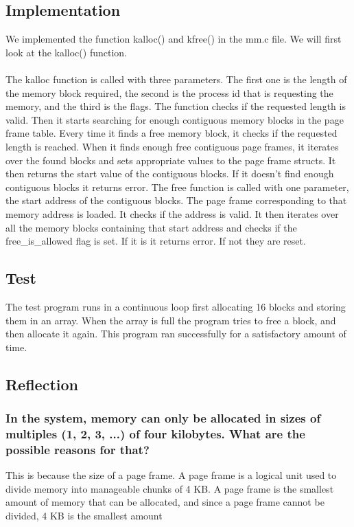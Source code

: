 \subsection{Implementation}
We implemented the function kalloc() and kfree() in the mm.c file. We will first look at the kalloc() function.\\\\
The kalloc function is called with three parameters. The first one is the length of the memory block required, the second is the process id that is requesting the memory, and the third is the flags. The function checks if the requested length is valid. Then it starts searching for enough contiguous memory blocks in the page frame table. Every time it finds a free memory block, it checks if the requested length is reached. When it finds enough free contiguous page frames, it iterates over the found blocks and sets appropriate values to the page frame structs. It then returns the start value of the contiguous blocks. If it doesn’t find enough contiguous blocks it returns error.
The free function is called with one parameter, the start address of the contiguous blocks. The page frame corresponding to that memory address is loaded. It checks if the address is valid. It then iterates over all the memory blocks containing that start address and checks if the free\_is\_allowed flag is set. If it is it returns error. If not they are reset.

\subsection{Test}
The test program runs in a continuous loop first allocating 16 blocks and storing them in an array. When the array is full the program tries to free a block, and then allocate it again. This program ran successfully for a satisfactory amount of time.

\subsection{Reflection}

\subsubsection*{In the system, memory can only be allocated in sizes of multiples (1, 2, 3, ...) of four kilobytes. What are the possible reasons for that?}
This is because the size of a page frame. A page frame is a logical unit used to divide memory into manageable chunks of 4 KB. A page frame is the smallest amount of memory that can be allocated, and since a page frame cannot be divided, 4 KB is the smallest amount


